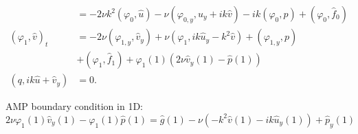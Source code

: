 \documentclass[8pt]{beamer}
\begin{document}
\begin{frame}
\begin{align}
        &=
        -2 \nu k^2 (\varphi_0, \hat{u})
        - \nu (\varphi_{0,y}, \hat{u}_y + i k \hat{v})
        - i k (\varphi_0, p)
        + (\varphi_0, \hat{f}_0)                                              \\
        (\varphi_1, \hat{v})_t
        &=
        -2 \nu (\varphi_{1,y}, \hat{v}_y)
        + \nu (\varphi_1, i k \hat{u}_y - k^2 \hat{v})
        + (\varphi_{1,y}, p)                                                  \\
        &+ (\varphi_1, \hat{f}_1)
        + \varphi_1(1) (2 \nu \hat{v}_y(1) - \hat{p}(1))                      \\
        (q, i k \hat{u} + \hat{v}_y)
        &= 0.
    \end{align}

    \pause
    AMP boundary condition in 1D:
    \begin{equation}
        2 \nu \varphi_1(1) \hat{v}_y(1) - \varphi_1(1) \hat{p}(1)
        = \hat{g}(1) - \nu (-k^2 \hat{v}(1) - i k \hat{u}_y(1)) + \hat{p}_y(1)
    \end{equation}
\end{frame}
\end{document}
